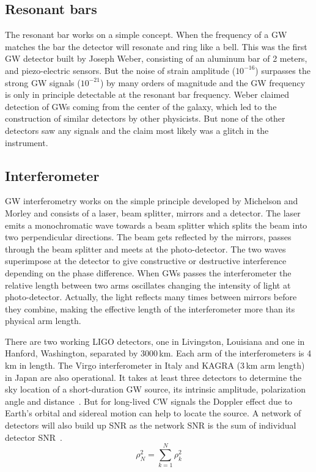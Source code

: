 \documentclass{ttuthes2007}
\begin{document}
\subsection{Resonant bars}
The resonant bar works on a simple concept. When the frequency of a
\ac{GW} matches the bar the detector will resonate and ring like a bell. This
was the first \ac{GW} detector built by Joseph Weber, consisting of an
aluminum bar of 2 meters, and piezo-electric sensors. But the
noise of strain amplitude ($10^{-16}$) surpasses the strong \ac{GW}
signals ($10^{-21}$) by many orders of
magnitude and the GW frequency is only in principle detectable at the resonant
bar frequency. Weber claimed detection of \acp{GW} coming from the center of
 the galaxy, which led to the construction of similar detectors by other
physicists. But none of the
other detectors saw any signals and the claim most likely was a glitch in the
instrument.
\subsection{Interferometer}
\ac{GW} interferometry works on the simple principle
developed by Michelson and Morley and consists of a laser, beam splitter,
mirrors and a detector. The laser emits a monochromatic wave towards a beam
splitter which splits the beam into two perpendicular directions. The beam gets
reflected by the mirrors, passes through the beam splitter and meets at the
photo-detector. The two waves superimpose at the detector to give constructive or
destructive interference depending on the phase difference. When \acp{GW} passes
the interferometer the relative length between two arms oscillates changing the
intensity of light at photo-detector. Actually, the light reflects many times
between mirrors before they combine, making the effective length of the
interferometer more than its physical arm length.

There are two working \ac{LIGO} detectors, one in Livingston, Louisiana and one
in Hanford, Washington, 
separated by 3000\,km. Each arm of the interferometers is 4\,km in length. The
Virgo interferometer in Italy and KAGRA (3\,km arm length) in Japan are also
operational. It takes at least three detectors to determine the sky location of 
a short-duration \ac{GW} source, its intrinsic amplitude, polarization angle and 
distance~\cite{Schutz_2011}. But for long-lived \ac{CW} signals the Doppler effect
due to Earth's orbital and sidereal motion can help to locate the source. A
network of detectors will also build up \ac{SNR} as the
network SNR is the sum of individual detector SNR~\cite{Schutz_2011}.
\begin{equation}
\rho_N^2=\sum_{k=1}^N \rho_k^2 
\end{equation}
\end{document}
